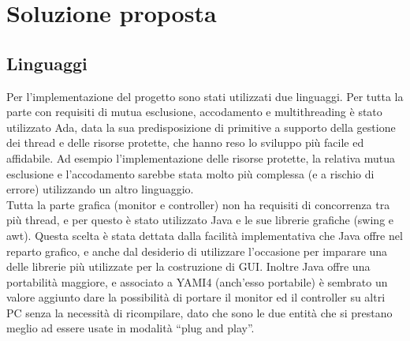 
\chapter{Soluzione proposta} %

\label{Chapter6} %



\section{Linguaggi}

Per l’implementazione del progetto sono stati utilizzati due linguaggi. Per tutta la parte con requisiti di mutua esclusione, accodamento e multithreading è stato utilizzato Ada, data la sua predisposizione di primitive a supporto della gestione dei thread e delle risorse protette, che hanno reso lo sviluppo più facile ed affidabile. Ad esempio l’implementazione delle risorse protette, la relativa mutua esclusione e l’accodamento sarebbe stata molto più complessa (e a rischio di errore) utilizzando un altro linguaggio. \\
Tutta la parte grafica (monitor e controller) non ha requisiti di concorrenza tra più thread, e per questo è stato utilizzato Java e le sue librerie grafiche (swing e awt). Questa scelta è stata dettata dalla facilità implementativa che Java offre nel reparto grafico, e anche dal desiderio di utilizzare l’occasione per imparare una delle librerie più utilizzate per la costruzione di GUI. Inoltre Java offre una portabilità maggiore, e associato a YAMI4 (anch’esso portabile) è sembrato un valore aggiunto dare la possibilità di portare il monitor ed il controller su altri PC senza la necessità di ricompilare, dato che sono le due entità che si prestano meglio ad essere usate in modalità “plug and play”.
\newpage

